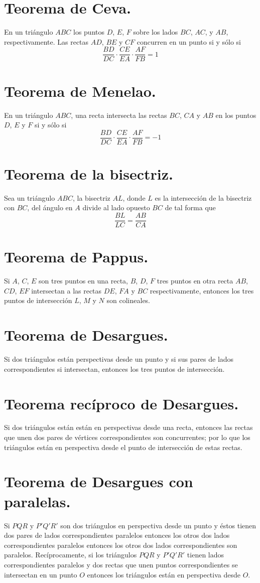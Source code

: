 \documentclass[12pt,a4paper,oneside]{book}
\begin{document}
\section{Teorema de Ceva.}
En un triángulo $ABC$ los puntos $D$, $E$, $F$ sobre los lados $BC$, $AC$, y $AB$, respectivamente. Las rectas $AD$, $BE$ y $CF$ concurren en un punto si y sólo si
$$\dfrac{BD}{DC}\cdot\dfrac{CE}{EA}\cdot\dfrac{AF}{FB}=1$$
\section{Teorema de Menelao.}
En un triángulo $ABC$, una recta intersecta las rectas $BC$, $CA$ y $AB$ en los puntos $D$, $E$ y $F$ si y sólo si
$$\dfrac{BD}{DC}\cdot\dfrac{CE}{EA}\cdot\dfrac{AF}{FB}=-1$$
\section{Teorema de la bisectriz.}
Sea un triángulo $ABC$, la bisectriz $AL$, donde $L$ es la intersección de la bisectriz con $BC$, del ángulo en $A$ divide al lado opuesto $BC$ de tal forma que
$$\dfrac{BL}{LC}=\dfrac{AB}{CA}$$
\section{Teorema de Pappus.}
Si $A$, $C$, $E$ son tres puntos en una recta, $B$, $D$, $F$ tres puntos en otra recta $AB$, $CD$, $EF$ intersectan a las rectas $DE$, $FA$ y $BC$ respectivamente, entonces los tres puntos de intersección $L$, $M$ y $N$ son colineales.
\section{Teorema de Desargues.}
Si dos triángulos están perspectivas desde un punto y si sus pares de lados correspondientes si intersectan, entonces los tres puntos de intersección.
\section{Teorema recíproco de Desargues.}
Si dos triángulos están están en perspectivas desde una recta, entonces las rectas que unen dos pares de vértices correspondientes son concurrentes; por lo que los triángulos están en perspectiva desde el punto de intersección de estas rectas.
\section{Teorema de Desargues con paralelas.}
Si $PQR$ y $P'Q'R'$ son dos triángulos  en perspectiva desde un punto y éstos tienen dos pares de lados correspondientes paralelos entonces los otros dos lados correspondientes paralelos entonces los otros dos lados correspondientes son paralelos. Recíprocamente, si los triángulos $PQR$ y $P'Q'R'$ tienen lados correspondientes paralelos y dos rectas que unen puntos correspondientes se intersectan en un punto $O$ entonces los triángulos están en perspectiva desde $O$.
\end{document}
